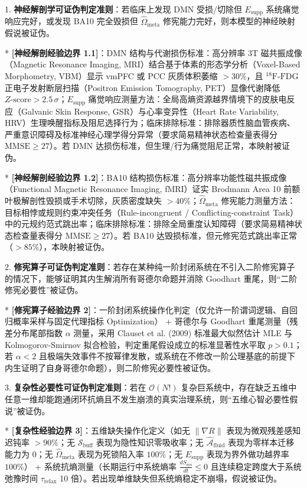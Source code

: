 \documentclass[11pt,a4paper,oneside]{ctexart}
\begin{document}
\begin{cautionbox}
1. \textbf{神经解剖学可证伪判定准则}：若临床上发现 DMN 受损/切除但 $E_{\text{supp}}$ 系统痛觉响应完好，或发现 BA10 完全毁损但 $\hat{\Omega}_{\text{meta}}$ 修宪能力完好，则本模型的神经映射假说被证伪。

* \textbf{[神经解剖经验边界 1.1]}：DMN 结构与代谢损伤标准：高分辨率 3T 磁共振成像（Magnetic Resonance Imaging, MRI）结合基于体素的形态学分析（Voxel-Based Morphometry, VBM）显示 vmPFC 或 PCC 灰质体积萎缩 $>30\%$，且 $^{18}\text{F-FDG}$ 正电子发射断层扫描（Positron Emission Tomography, PET）显像代谢降低 $Z\text{-score} > 2.5\,\sigma$；$E_{\text{supp}}$ 痛觉响应测量方法：全局高熵资源越界情境下的皮肤电反应（Galvanic Skin Response, GSR）与心率变异性（Heart Rate Variability, HRV）生理唤醒指标及阻尼选择行为；临床排除标准：排除器质性脑血管疾病、严重意识障碍及标准神经心理学得分异常（要求简易精神状态检查量表得分 $\text{MMSE} \ge 27$）。若 DMN 达损伤标准，但生理/行为痛觉阻尼正常，本映射被证伪。

* \textbf{[神经解剖经验边界 1.2]}：BA10 结构损伤标准：高分辨率功能性磁共振成像（Functional Magnetic Resonance Imaging, fMRI）证实 Brodmann Area 10 前额叶极解剖性毁损或手术切除，灰质密度缺失 $>40\%$；$\hat{\Omega}_{\text{meta}}$ 修宪能力测量方法：目标相悖或规则约束冲突任务（Rule-incongruent / Conflicting-constraint Task）中的元规约范式跳出率；临床排除标准：排除全局重度认知障碍（要求简易精神状态检查量表得分 $\text{MMSE} \ge 27$）。若 BA10 达毁损标准，但元修宪范式跳出率正常（$>85\%$），本映射被证伪。

2. \textbf{修宪算子可证伪判定准则}：若存在某种纯一阶封闭系统在不引入二阶修宪算子的情况下，能够证明其内生解消所有哥德尔命题并消除 Goodhart 重尾，则“二阶修宪必要性”被证伪。

* \textbf{[修宪算子经验边界 2]}：一阶封闭系统操作化判定（仅允许一阶谓词逻辑、自回归概率采样与固定代理指标 Optimization） + 哥德尔与 Goodhart 重尾测量（残差分布尾部指数 $\alpha$ 测量，采用 Clauset et al. (2009) 标准最大似然估计 MLE 与 Kolmogorov-Smirnov 拟合检验，判定重尾假设成立的标准显著性水平取 $p > 0.1$；若 $\alpha < 2$ 且极端失效事件不按幂律发散，或系统在不修改一阶公理基底的前提下内生证明了自身哥德尔命题），则二阶修宪必要性被证伪。

3. \textbf{复杂性必要性可证伪判定准则}：若在 $\mathcal{O}(N!)$ 复杂巨系统中，存在缺乏五维中任意一维却能跑通闭环抗熵且不发生崩溃的真实治理系统，则“五维心智必要性假说”被证伪。

* \textbf{[复杂性经验边界 3]}：五维缺失操作化定义（如无 $\|\nabla R\|$ 表现为微观残差感知迟钝率 $>90\%$；无 $\mathcal{S}_{\text{buff}}$ 表现为隐性知识零吸收率；无 $\hat{\mathcal{A}}_{\text{fluid}}$ 表现为零样本迁移能力为 0；无 $\hat{\Omega}_{\text{meta}}$ 表现为死锁陷入率 $100\%$；无 $E_{\text{supp}}$ 表现为界外做功越界率 $100\%$） + 系统抗熵测量（长期运行中系统熵率 $\frac{dS_{\text{sys}}}{dt} \le 0$ 且连续稳定跨度大于系统弛豫时间 $\tau_{\text{relax}}$ 10 倍）。若出现单维缺失但系统熵稳定不崩塌，假说被证伪。
\end{cautionbox}
\end{document}
